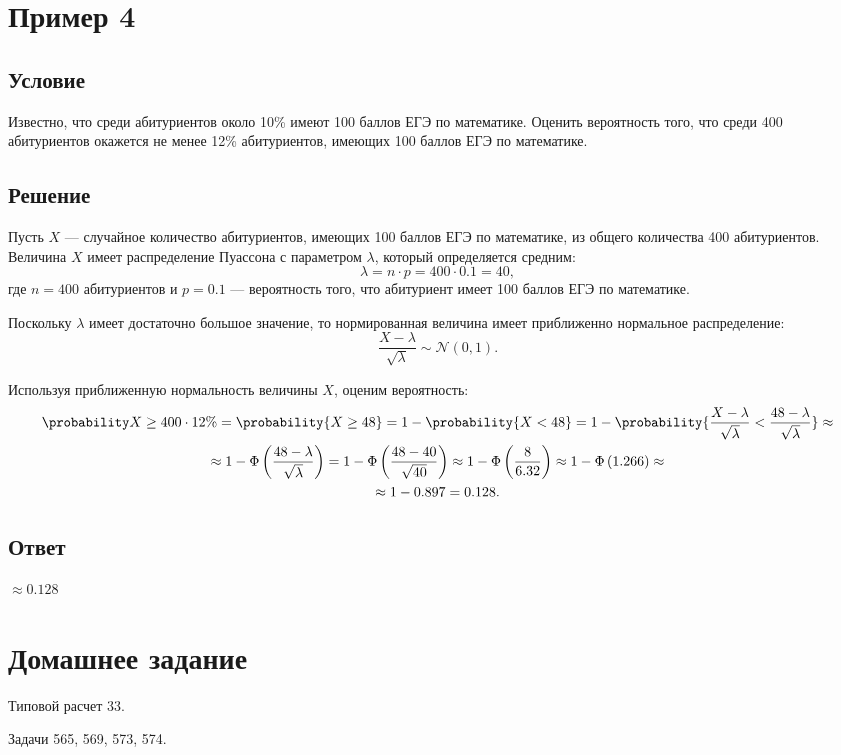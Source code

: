 \section{Пример 4}
\subsection*{Условие}
Известно, что среди абитуриентов около 10\% имеют 100 баллов ЕГЭ по математике. Оценить вероятность того, что среди 400 абитуриентов окажется не менее 12\%
абитуриентов, имеющих 100 баллов ЕГЭ по математике.

\subsection*{Решение}
Пусть $X$ --- случайное количество абитуриентов, имеющих 100 баллов ЕГЭ по математике, из общего количества 400 абитуриентов. Величина $X$ имеет распределение Пуассона
с параметром $\lambda$, который определяется средним:
\begin{equation}
    \lambda = n \cdot p = 400 \cdot 0.1 = 40,
\end{equation}
где $n = 400$ абитуриентов и $p = 0.1$ --- вероятность того, что абитуриент имеет 100 баллов ЕГЭ по математике.

Поскольку $\lambda$ имеет достаточно большое значение, то нормированная величина имеет приближенно нормальное распределение:
\begin{equation}
    \frac{X - \lambda}{\sqrt{\lambda}} \sim \mathcal{N} \left ( 0, 1 \right ) .
\end{equation}

Используя приближенную нормальность величины $X$, оценим вероятность:
\begin{multline}
    \probability{X \ge 400 \cdot 12\%}
    = \probability{X \ge 48}
    = 1 - \probability{X < 48}
    = 1 - \probability{\frac{X - \lambda}{\sqrt{\lambda}} < \frac{48 - \lambda}{\sqrt{\lambda}}} \approx \\
    \approx 1 - \Phi \left ( \frac{48 - \lambda}{\sqrt{\lambda}} \right )
    = 1 - \Phi \left ( \frac{48 - 40}{\sqrt{40}} \right )
    \approx 1 - \Phi \left ( \frac{8}{6.32} \right )
    \approx 1 - \Phi \left ( 1.266 \right ) \approx \\
    \approx 1 - 0.897
    = 0.128 .
\end{multline}

\subsection*{Ответ}
$\approx 0.128$


\section{Домашнее задание}
Типовой расчет 33.

Задачи 565, 569, 573, 574.
